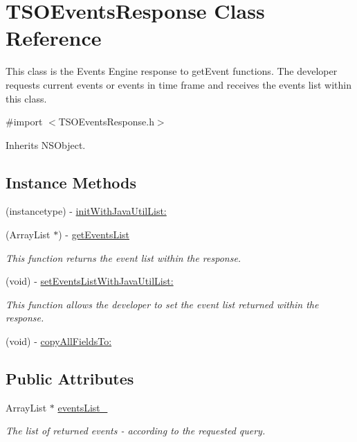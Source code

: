 \hypertarget{interface_t_s_o_events_response}{}\section{T\+S\+O\+Events\+Response Class Reference}
\label{interface_t_s_o_events_response}


This class is the Events Engine response to get\+Event functions. The developer requests current events or events in time frame and receives the events list within this class.  




{\ttfamily \#import $<$T\+S\+O\+Events\+Response.\+h$>$}



Inherits N\+S\+Object.

\subsection*{Instance Methods}
\begin{DoxyCompactItemize}
\item 
(instancetype) -\/ \hyperlink{interface_t_s_o_events_response_aa2339558c458d46fd1d1747512e84bc1}{init\+With\+Java\+Util\+List\+:}
\item 
(Array\+List $\ast$) -\/ \hyperlink{interface_t_s_o_events_response_ae41d975d647fe61408b41c15adabc927}{get\+Events\+List}
\begin{DoxyCompactList}\small\item\em This function returns the event list within the response. \end{DoxyCompactList}\item 
(void) -\/ \hyperlink{interface_t_s_o_events_response_a45808a1f550355e92194cb5f4413aa78}{set\+Events\+List\+With\+Java\+Util\+List\+:}
\begin{DoxyCompactList}\small\item\em This function allows the developer to set the event list returned within the response. \end{DoxyCompactList}\item 
(void) -\/ \hyperlink{interface_t_s_o_events_response_a5892332c9e33c04d529db37bd53d57ee}{copy\+All\+Fields\+To\+:}
\end{DoxyCompactItemize}
\subsection*{Public Attributes}
\begin{DoxyCompactItemize}
\item 
Array\+List $\ast$ \hyperlink{interface_t_s_o_events_response_a693e242a4e9a0fb6cd8edc1da85cc7d5}{events\+List\+\_\+}
\begin{DoxyCompactList}\small\item\em The list of returned events -\/ according to the requested query. \end{DoxyCompactList}\end{DoxyCompactItemize}


